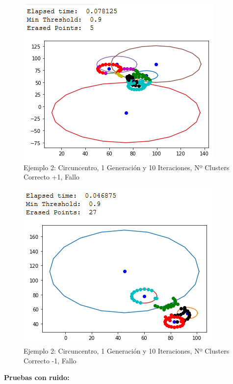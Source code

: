 \documentclass[conference,a4paper]{IEEEtran}
\begin{document}
\begin{figure}[H]
\centering
\includegraphics[scale=0.65]{Experimentacion/Ejemplo2/ej2_c_1_10_mc_wrong}
\caption{Ejemplo 2: Circuncentro, 1 Generación y 10 Iteraciones,  Nº Clusters Correcto +1, Fallo\\}
\end{figure}

\begin{figure}[H]
\centering
\includegraphics[scale=0.65]{Experimentacion/Ejemplo2/ej2_c_1_10_lc_wrong}
\caption{Ejemplo 2: Circuncentro, 1 Generación y 10 Iteraciones,  Nº Clusters Correcto -1, Fallo\\}
\end{figure}

\newpage
\textbf{Pruebas con ruido:}\\
\end{document}

